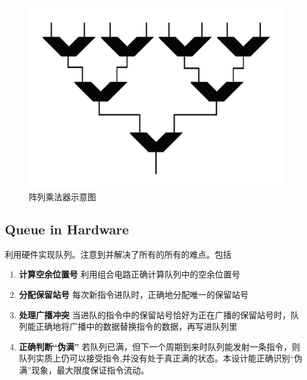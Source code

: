 \documentclass[twoside]{article}
\begin{document}
\begin{figure}[htp]
    \centering
    \includegraphics[width=12cm]{"./figure/mulALU.jpg"}
    \caption{阵列乘法器示意图}
    \label{fig:mulALU}
\end{figure}



\subsection{Queue in Hardware}
利用硬件实现队列。注意到并解决了所有的所有的难点。包括 
\begin{enumerate}
	\item \textbf{计算空余位置号   }利用组合电路正确计算队列中的空余位置号
	\item \textbf{分配保留站号   } 每次新指令进队时，正确地分配唯一的保留站号
	\item \textbf{处理广播冲突   }当进队的指令中的保留站号恰好为正在广播的保留站号时，队列能正确地将广播中的数据替换指令的数据，再写进队列里
	\item \textbf{正确判断“伪满”   }若队列已满，但下一个周期到来时队列能发射一条指令，则队列实质上仍可以接受指令,并没有处于真正满的状态。本设计能正确识别“伪满”现象，最大限度保证指令流动。
\end{enumerate} 
  
\end{document}
